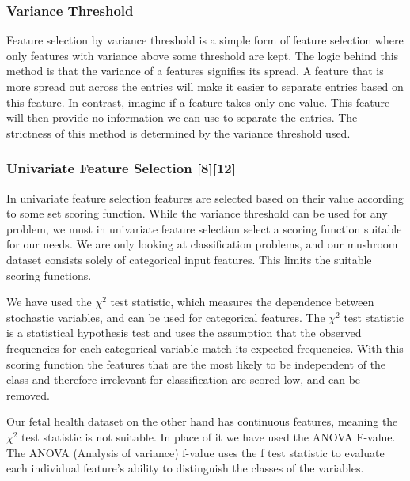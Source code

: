 \documentclass[11pt]{article}
\begin{document}
\hypertarget{variance-threshold}{%
\subsubsection*{Variance Threshold}\label{variance-threshold}}

Feature selection by variance threshold is a simple form of feature selection where only features with variance above some threshold are kept. The logic behind this method is that the variance of a features signifies its spread. A feature that is more spread out across the entries will make it easier to separate entries based on this feature. In contrast, imagine if a feature takes only one value. This feature will then provide no information we can use to separate the entries. The strictness of this method is determined by the variance threshold used.


\hypertarget{univariate-feature-selection}{%
\subsubsection*{Univariate Feature Selection
{[}8{]}[12]}\label{univariate-feature-selection}}

In univariate feature selection features are selected based on their value according to some set scoring function. While the variance threshold can be used for any problem, we must in univariate feature selection select a scoring function suitable for our needs. We are only looking at classification problems, and our mushroom dataset consists solely of categorical input features. This limits the suitable scoring functions. 

We have used the \(\chi^2\) test statistic, which measures the dependence
between stochastic variables, and can be used for categorical features. The \(\chi^2\) test statistic is a statistical hypothesis test and uses the assumption that the observed frequencies for each categorical variable
match its expected frequencies. With this scoring function the features that are the most likely to be independent of the class and therefore irrelevant for classification are scored low, and can be removed. 

Our fetal health dataset on the other hand has continuous features, meaning the \(\chi^2\) test statistic is not suitable. In place of it we have used the ANOVA F-value. The ANOVA (Analysis of variance) f-value uses the f test statistic to evaluate each individual feature's ability to distinguish the classes of the variables. 
\end{document}
